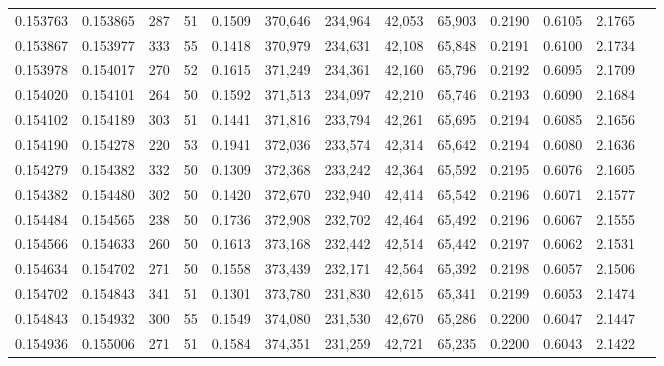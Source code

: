 \begin{tabular}{rrrrrrrrrrrrr}
0.153763 & 0.153865 &   287 &  51 &                                     0.1509 & 370,646 & 234,964 &  42,053 &  65,903 & 0.2190 & 0.6105 & 2.1765 \\
0.153867 & 0.153977 &   333 &  55 &                                     0.1418 & 370,979 & 234,631 &  42,108 &  65,848 & 0.2191 & 0.6100 & 2.1734 \\
0.153978 & 0.154017 &   270 &  52 &                                     0.1615 & 371,249 & 234,361 &  42,160 &  65,796 & 0.2192 & 0.6095 & 2.1709 \\
0.154020 & 0.154101 &   264 &  50 &                                     0.1592 & 371,513 & 234,097 &  42,210 &  65,746 & 0.2193 & 0.6090 & 2.1684 \\
0.154102 & 0.154189 &   303 &  51 &                                     0.1441 & 371,816 & 233,794 &  42,261 &  65,695 & 0.2194 & 0.6085 & 2.1656 \\
0.154190 & 0.154278 &   220 &  53 &                                     0.1941 & 372,036 & 233,574 &  42,314 &  65,642 & 0.2194 & 0.6080 & 2.1636 \\
0.154279 & 0.154382 &   332 &  50 &                                     0.1309 & 372,368 & 233,242 &  42,364 &  65,592 & 0.2195 & 0.6076 & 2.1605 \\
0.154382 & 0.154480 &   302 &  50 &                                     0.1420 & 372,670 & 232,940 &  42,414 &  65,542 & 0.2196 & 0.6071 & 2.1577 \\
0.154484 & 0.154565 &   238 &  50 &                                     0.1736 & 372,908 & 232,702 &  42,464 &  65,492 & 0.2196 & 0.6067 & 2.1555 \\
0.154566 & 0.154633 &   260 &  50 &                                     0.1613 & 373,168 & 232,442 &  42,514 &  65,442 & 0.2197 & 0.6062 & 2.1531 \\
0.154634 & 0.154702 &   271 &  50 &                                     0.1558 & 373,439 & 232,171 &  42,564 &  65,392 & 0.2198 & 0.6057 & 2.1506 \\
0.154702 & 0.154843 &   341 &  51 &                                     0.1301 & 373,780 & 231,830 &  42,615 &  65,341 & 0.2199 & 0.6053 & 2.1474 \\
0.154843 & 0.154932 &   300 &  55 &                                     0.1549 & 374,080 & 231,530 &  42,670 &  65,286 & 0.2200 & 0.6047 & 2.1447 \\
0.154936 & 0.155006 &   271 &  51 &                                     0.1584 & 374,351 & 231,259 &  42,721 &  65,235 & 0.2200 & 0.6043 & 2.1422 \\

\end{tabular}

